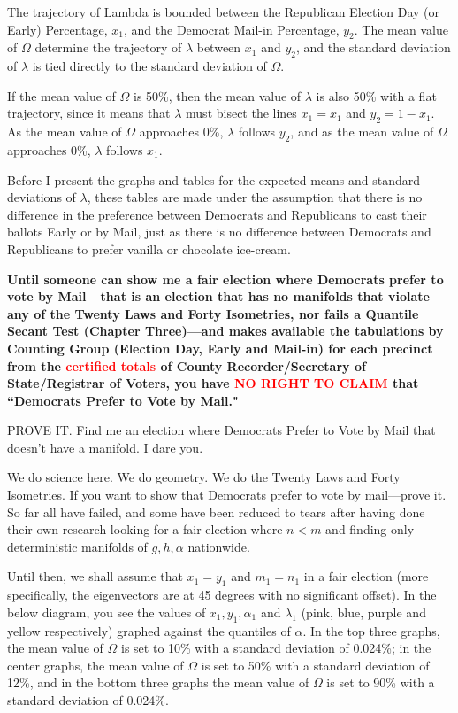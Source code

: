 \documentclass[preprint,13pt]{elsarticle}
\begin{document}
The trajectory of Lambda is bounded between the Republican Election Day (or Early) Percentage, $x_{1}$, and the Democrat Mail-in Percentage, $y_{2}$. The mean value of $\Omega$ determine the trajectory of $\lambda$ between $x_{1}$ and $y_{2}$, and the standard deviation of $\lambda$ is tied directly to the standard deviation of $\Omega$.  

If the mean value of $\Omega$ is 50\%, then the mean value of $\lambda$ is also 50\% with a flat trajectory, since it means that $\lambda$ must bisect the lines $x_{1}=x_{1}$ and $y_{2}=1-x_{1}$. As the mean value of $\Omega$ approaches 0\%, $\lambda$ follows $y_{2}$, and as the mean value of $\Omega$ approaches 0\%, $\lambda$ follows $x_{1}$.

Before I present the graphs and tables for the expected means and standard deviations of $\lambda$, these tables are made under the assumption that there is no difference in the preference between Democrats and Republicans to cast their ballots Early or by Mail, just as there is no difference between Democrats and Republicans to prefer vanilla or chocolate ice-cream.

\textbf{Until someone can show me a fair election where Democrats prefer to vote by Mail---that is an election that has no manifolds that violate any of the Twenty Laws and Forty Isometries, nor fails a Quantile Secant Test (Chapter Three)---and makes available the tabulations by Counting Group (Election Day, Early and Mail-in) for each precinct from the \textcolor{red}{certified totals} of County Recorder/Secretary of State/Registrar of Voters, you have \textcolor{red}{NO RIGHT TO CLAIM} that ``Democrats Prefer to Vote by Mail."}

PROVE IT. Find me an election where Democrats Prefer to Vote by Mail that doesn't have a manifold. I dare you.

We do science here. We do geometry. We do the Twenty Laws and Forty Isometries. If you want to show that Democrats prefer to vote by mail---prove it. So far all have failed, and some have been reduced to tears after having done their own research looking for a fair election where $n<m$ and finding only deterministic manifolds of $g,h,\alpha$ nationwide.

Until then, we shall assume that $x_{1}=y_{1}$ and $m_{1}=n_{1}$ in a fair election (more specifically, the eigenvectors are at 45 degrees with no significant offset).
\newpage
In the below diagram, you see the values of $x_{1}, y_{1},\alpha_{1}$ and $\lambda_{1}$ (pink, blue, purple and yellow respectively) graphed against the quantiles of $\alpha$. In the top three graphs, the mean value of $\Omega$ is set to 10\% with a standard deviation of 0.024\%; in the center graphs, the mean value of $\Omega$ is set to 50\% with a standard deviation of 12\%, and in the bottom three graphs the mean value of $\Omega$ is set to 90\% with a standard deviation of 0.024\%. 
\end{document}
